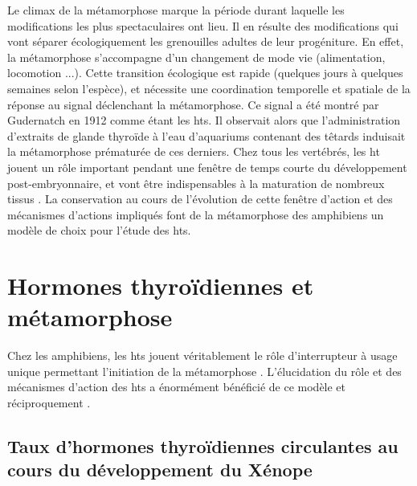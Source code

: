 \documentclass[../main.tex]{subfiles}
\begin{document}
		Le climax de la métamorphose marque la période durant laquelle les modifications les plus spectaculaires ont lieu.
		Il en résulte des modifications qui vont séparer écologiquement les grenouilles adultes de leur progéniture.
		En effet, la métamorphose s'accompagne d'un changement de mode vie (alimentation, locomotion ...).
		Cette transition écologique est rapide (quelques jours à quelques semaines selon l'espèce), et nécessite une coordination temporelle et spatiale de la réponse au signal déclenchant la métamorphose.
		Ce signal a été montré par Gudernatch en 1912 comme étant les \glspl{ht}.
		Il observait alors que l'administration d'extraits de glande thyroïde à l'eau d'aquariums contenant des têtards induisait la métamorphose prématurée de ces derniers.
		Chez tous les vertébrés, les \gls{ht} jouent un rôle important pendant une fenêtre de temps courte du développement post-embryonnaire, et vont être indispensables à la maturation de nombreux tissus \citep{Laudet2011b}.
		La conservation au cours de l'évolution de cette fenêtre d'action et des mécanismes d'actions impliqués font de la métamorphose des amphibiens un modèle de choix pour l'étude des \glspl{ht}.



\section{Hormones thyroïdiennes et métamorphose}

	Chez les amphibiens, les \glspl{ht} jouent véritablement le rôle d'interrupteur à usage unique permettant l'initiation de la métamorphose \citep{Shi1998}.
	L'élucidation du rôle et des mécanismes d'action des \glspl{ht} a énormément bénéficié de ce modèle et réciproquement \citep{Wong1995,Wong1998a}.


	\subsection{Taux d'hormones thyroïdiennes circulantes au cours du développement du Xénope}
\end{document}
